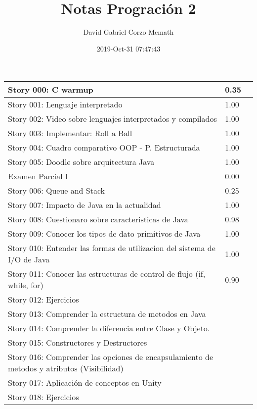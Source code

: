 \documentclass{article}
\title{Notas Progración 2}
\author{David Gabriel Corzo Mcmath}
\date{2019-Oct-31 07:47:43}
\begin{document}
\maketitle

\begin{center}
    \begin{tabular}{ | p{11cm} | p{2cm} | p{2cm} | }
     \hline
     Story 000: C warmup & 0.35 & \\ 
     \hline
     Story 001: Lenguaje interpretado &  1.00 & \\ 
     \hline
    Story 002: Video sobre lenguajes interpretados y compilados & 1.00 & \\ 
    \hline
    Story 003: Implementar: Roll a Ball & 1.00 & \\ 
    \hline
    Story 004: Cuadro comparativo OOP - P. Estructurada & 1.00 & \\ 
    \hline
    Story 005: Doodle sobre arquitectura Java & 1.00 & \\ 
    \hline
    Examen Parcial I & 0.00 & \\ 
    \hline
    Story 006: Queue and Stack & 0.25 & \\ 
    \hline
    Story 007: Impacto de Java en la actualidad & 1.00 & \\ 
    \hline
    Story 008: Cuestionaro sobre caracteristicas de Java & 0.98 & \\ 
    \hline
    Story 009: Conocer los tipos de dato primitivos de Java & 1.00  & \\ 
    \hline
    Story 010: Entender las formas de utilizacion del sistema de I/O de Java & 1.00  &  \\ 
    \hline
    Story 011: Conocer las estructuras de control de flujo (if, while, for) & 0.90  & \\ 
    \hline
    Story 012: Ejercicios &  & \\ 
    \hline
    Story 013: Comprender la estructura de metodos en Java &   & \\ 
    \hline
    Story 014: Comprender la diferencia entre Clase y Objeto. &   & \\ 
    \hline
    Story 015: Constructores y Destructores &   & \\ 
    \hline
    Story 016: Comprender las opciones de encapsulamiento de metodos y atributos (Visibilidad) &  &  \\ 
    \hline
    Story 017: Aplicación de conceptos en Unity &   & \\ 
    \hline
    Story 018: Ejercicios &   & \\ 

\end{tabular}
\end{center}
\end{document}
